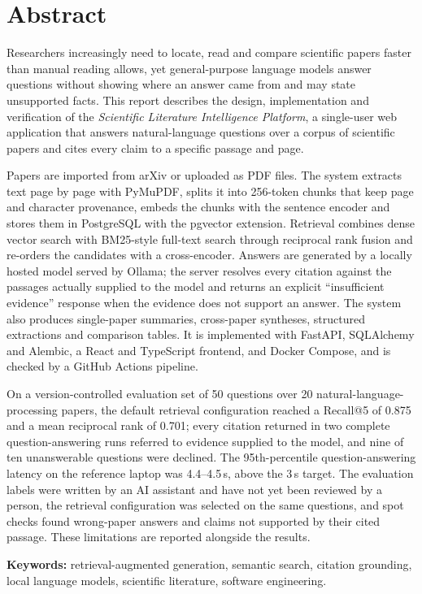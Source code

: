 \chapter*{Abstract}

Researchers increasingly need to locate, read and compare scientific papers faster than manual reading allows,
yet general-purpose language models answer questions without showing where an answer came from and may state
unsupported facts. This report describes the design, implementation and verification of the
\emph{Scientific Literature Intelligence Platform}, a single-user web application that answers natural-language
questions over a corpus of scientific papers and cites every claim to a specific passage and page.

Papers are imported from arXiv or uploaded as PDF files. The system extracts text page by page with PyMuPDF,
splits it into 256-token chunks that keep page and character provenance, embeds the chunks with the
 sentence encoder and stores them in PostgreSQL with the pgvector extension. Retrieval
combines dense vector search with BM25-style full-text search through reciprocal rank fusion and re-orders the
candidates with a cross-encoder. Answers are generated by a locally hosted  model served by
Ollama; the server resolves every citation against the passages actually supplied to the model and returns an
explicit ``insufficient evidence'' response when the evidence does not support an answer. The system also
produces single-paper summaries, cross-paper syntheses, structured extractions and comparison tables. It is
implemented with FastAPI, SQLAlchemy and Alembic, a React and TypeScript frontend, and Docker Compose, and is
checked by a GitHub Actions pipeline.

On a version-controlled evaluation set of 50 questions over 20 natural-language-processing papers, the default
retrieval configuration reached a Recall@5 of 0.875 and a mean reciprocal rank of 0.701; every citation returned
in two complete question-answering runs referred to evidence supplied to the model, and nine of ten unanswerable
questions were declined. The 95th-percentile question-answering latency on the reference laptop was 4.4--4.5\,s,
above the 3\,s target. The evaluation labels were written by an AI assistant and have not yet been reviewed by a
person, the retrieval configuration was selected on the same questions, and spot checks found wrong-paper
answers and claims not supported by their cited passage. These limitations are reported alongside the results.

\vspace{1em}
\noindent\textbf{Keywords:} retrieval-augmented generation, semantic search, citation grounding, local language
models, scientific literature, software engineering.
